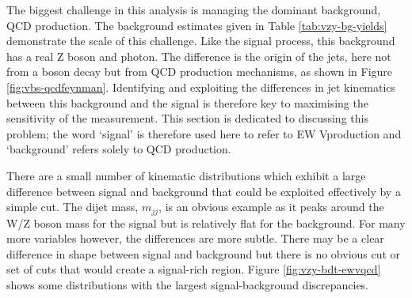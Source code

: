 
The biggest challenge in this analysis is managing the dominant background,
\ac{QCD} \Zyjj production. The background estimates given in Table
\ref{tab:vzy-bg-yields} demonstrate the scale of this challenge.
Like the signal process, this background has a real Z
boson and photon. The difference is the origin of the jets, here not from a
boson decay but from \ac{QCD} production mechanisms, as shown in Figure
\ref{fig:vbs-qcdfeynman}.
%
Identifying and exploiting the differences in jet kinematics between this
background and the signal is therefore key to maximising the sensitivity of the
measurement. This section is dedicated to discussing this problem; the word
`signal' is therefore used here to refer to \ac{EW} V\Zy production and `background'
refers solely to \ac{QCD} \Zyjj production.


There are a small number of kinematic distributions which exhibit a large
difference between signal and background that could be exploited effectively by
a simple cut. The dijet mass, $m_{jj}$, is an obvious example as it
peaks around the W/Z boson mass for the signal but is relatively flat for the
background.
%
For many more variables however, the differences are more subtle. There may be
a clear difference in shape between signal and background
but there is no obvious cut or set of cuts that would create a signal-rich
region. Figure \ref{fig:vzy-bdt-ewvqcd} shows some distributions with the
largest signal-background discrepancies.


